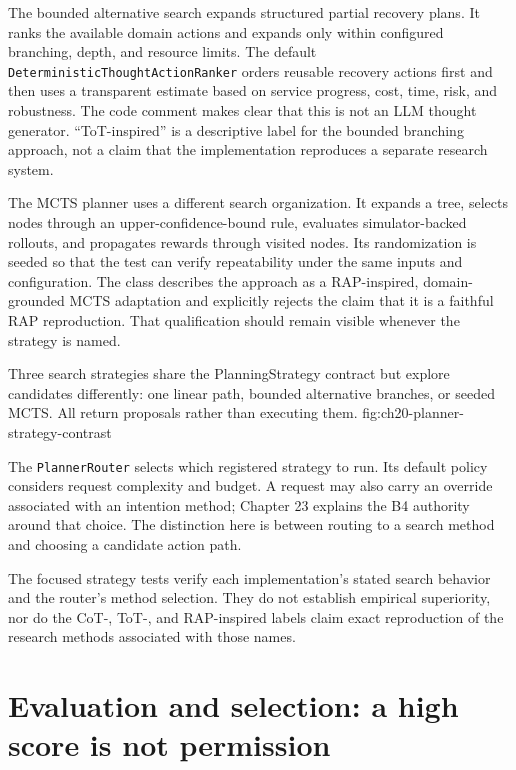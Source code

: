 The bounded alternative search expands structured partial recovery plans. It ranks the available domain actions and expands only within configured branching, depth, and resource limits. The default \texttt{DeterministicThoughtActionRanker} orders reusable recovery actions first and then uses a transparent estimate based on service progress, cost, time, risk, and robustness. The code comment makes clear that this is not an LLM thought generator. “ToT-inspired” is a descriptive label for the bounded branching approach, not a claim that the implementation reproduces a separate research system.

The MCTS planner uses a different search organization. It expands a tree, selects nodes through an upper-confidence-bound rule, evaluates simulator-backed rollouts, and propagates rewards through visited nodes. Its randomization is seeded so that the test can verify repeatability under the same inputs and configuration. The class describes the approach as a RAP-inspired, domain-grounded MCTS adaptation and explicitly rejects the claim that it is a faithful RAP reproduction. That qualification should remain visible whenever the strategy is named.

  {Three search strategies share the PlanningStrategy contract but explore candidates differently: one linear path, bounded alternative branches, or seeded MCTS. All return proposals rather than executing them.}
  {fig:ch20-planner-strategy-contrast}

The \texttt{PlannerRouter} selects which registered strategy to run. Its default policy considers request complexity and budget. A request may also carry an override associated with an intention method; Chapter 23 explains the B4 authority around that choice. The distinction here is between routing to a search method and choosing a candidate action path.

The focused strategy tests verify each implementation's stated search behavior and the router's method selection. They do not establish empirical superiority, nor do the CoT-, ToT-, and RAP-inspired labels claim exact reproduction of the research methods associated with those names.

\section{Evaluation and selection: a high score is not permission}
\label{sec:ch20-evaluation-selection}

